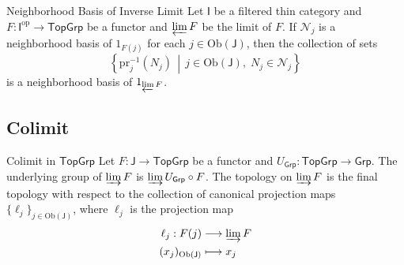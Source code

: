 \documentclass{report}
\newcommand{\midv}{\,\middle\vert\,}
\begin{document}
\begin{proposition}{Neighborhood Basis of Inverse Limit}{}
	Let $\mathsf{I}$ be a filtered thin category and $F:\mathsf{I}^{\mathrm{op}}\to \mathsf{TopGrp}$ be a functor and $\varprojlim F$ be the limit of $F$. If $\mathcal{N}_j$ is a neighborhood basis of $1_{F(j)}$ for each $j\in \mathrm{Ob}\left(\mathsf{J}\right)$, then the collection of sets
	\[
		\left\{\mathrm{pr}_j^{-1}(N_j)\midv j\in \mathrm{Ob}\left(\mathsf{J}\right),\;N_j\in \mathcal{N}_j\right\}
	\]
	is a neighborhood basis of $1_{\varprojlim F}$.
\end{proposition}

\subsection{Colimit}
\begin{definition}{Colimit in $\mathsf{TopGrp}$}{}
	Let $F:\mathsf{J}\to \mathsf{TopGrp}$ be a functor and $U_{\mathsf{Grp}}:\mathsf{TopGrp}\to \mathsf{Grp}$. The underlying group of $\varinjlim F$ is $\varinjlim  U_{\mathsf{Grp}}\circ F$. The topology on $\varinjlim F$ is the final topology with respect to the collection of canonical projection maps $\{\ell_j\}_{j\in\mathrm{Ob}\left(\mathsf{J}\right)}$,  where $\ell_j$ is the projection map
	\begin{align*}
		\ell_j:  F(j)&\longrightarrow \varinjlim F \\
		(x_j)_{\mathrm{Ob}\left(\mathsf{J}\right)}  & \longmapsto x_j
	\end{align*}
\end{definition}
\end{document}
